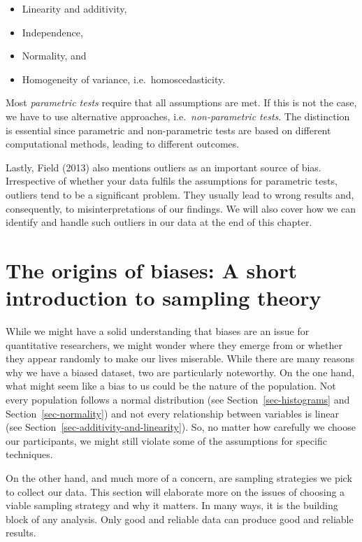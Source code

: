 \documentclass[
  letterpaper,
]{krantz}
\begin{document}
\begin{itemize}
\item
  Linearity and additivity,
\item
  Independence,
\item
  Normality, and
\item
  Homogeneity of variance, i.e.~homoscedasticity.
\end{itemize}

Most \emph{parametric tests} require that all assumptions are met. If
this is not the case, we have to use alternative approaches,
i.e.~\emph{non-parametric tests}. The distinction is essential since
parametric and non-parametric tests are based on different computational
methods, leading to different outcomes.

Lastly, Field (2013) also mentions outliers as an important source of
bias. Irrespective of whether your data fulfils the assumptions for
parametric tests, outliers tend to be a significant problem. They
usually lead to wrong results and, consequently, to misinterpretations
of our findings. We will also cover how we can identify and handle such
outliers in our data at the end of this chapter.

\section{The origins of biases: A short introduction to sampling
theory}\label{origins-of-bias}

While we might have a solid understanding that biases are an issue for
quantitative researchers, we might wonder where they emerge from or
whether they appear randomly to make our lives miserable. While there
are many reasons why we have a biased dataset, two are particularly
noteworthy. On the one hand, what might seem like a bias to us could be
the nature of the population. Not every population follows a normal
distribution (see Section~\ref{sec-histograms} and
Section~\ref{sec-normality}) and not every relationship between
variables is linear (see Section~\ref{sec-additivity-and-linearity}).
So, no matter how carefully we choose our participants, we might still
violate some of the assumptions for specific techniques.

On the other hand, and much more of a concern, are sampling strategies
we pick to collect our data. This section will elaborate more on the
issues of choosing a viable sampling strategy and why it matters. In
many ways, it is the building block of any analysis. Only good and
reliable data can produce good and reliable results.
\end{document}

